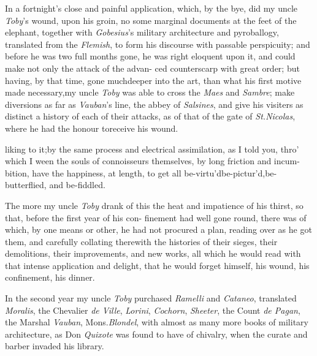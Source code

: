 \documentclass{article}
\begin{document}
In a fortnight’s close and painful application, which, by
the bye, did my uncle \textit{Toby}’s wound, upon his groin, no
some marginal documents at the feet of the elephant, together with \textit{Gobesius}’s
mi\-litary architecture and pyroballogy,
trans\-lated from the
\textit{Flemish}, to form his dis\-course with passable perspicuity;
and\break 
before he was two full months gone,\tsk\break
he was right eloquent upon it, and could make not only the
attack of the advan-
ced counterscarp with great order;\tsh\break 
but having, by that time, gone much\break deeper into
the art, than what his first motive made necessary,\tsk my uncle \textit{Toby} was able
to cross the \textit{Maes} and \textit{Sambre}; make diversions as far as
\textit{Vauban}’s line, the abbey of \textit{Salsines}, \etc and give his visiters
as distinct a history of each of their attacks, as of that of the gate of
\textit{St.\@ Nicolas}, where he had the honour to\break receive his wound.

\noindent
{}
liking to it;\tsk by the same process and\break
electrical assimilation, as I told you, thro’\break
which I ween the souls of connoisseurs\break
themselves, by long friction and incum-\break
bition, have the happiness, at length, to get all
be-virtu’d\tsk be-pictur’d,\tsk be-butterflied, and
be-fiddled.

The more my uncle \textit{Toby} drank of this\break
{}
the heat and impatience of his thirst,\break
so that, before the first year of his con-\break
finement had well gone round, there was\break
{}
of which, by one means or other, he had not
procured a plan, reading over as he got them, and carefully
collating therewith the histories of their sieges, their
demolitions, their improvements, and new works, all which he
would read with that intense application and delight, that he
would forget himself, his wound, his confinement, his dinner.

In the second year my uncle \textit{Toby} purchased \textit{Ramelli}
and \textit{Cataneo}, translated
\textit{Moralis}, the Chevalier \textit{de Ville}, \textit{Lorini},\break 
\textit{Cochorn}, \textit{Sheeter}, the Count \textit{de Pagan},\break 
the Marshal \textit{Vauban}, Mons.\@ \textit{Blondel}, with\break
almost as many more books of military architecture, as Don
\textit{Quixote} was found to have of chivalry, when the
curate and\break
barber invaded his library.
\end{document}
